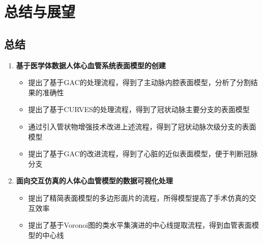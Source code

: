 \section{总结与展望}

\subsection{总结}
\begin{frame}
\begin{enumerate}
\item \textbf{基于医学体数据人体心血管系统表面模型的创建}
\begin{itemize}
\pause \item 提出了基于GAC的处理流程，得到了主动脉内腔表面模型，分析了分割结果的准确性
\pause \item 提出了基于CURVES的处理流程，得到了冠状动脉主要分支的表面模型
\pause \item 通过引入管状物增强技术改进上述流程，得到了冠状动脉次级分支的表面模型
\pause \item 提出了基于GAC的改进流程，得到了心脏的近似表面模型，便于判断冠脉分支
\end{itemize}
\pause \item \textbf{面向交互仿真的人体心血管模型的数据可视化处理}
\begin{itemize}
\pause \item 提出了精简表面模型的多边形面片的流程，所得模型提高了手术仿真的交互效率
\pause \item 提出了基于Voronoi图的类水平集演进的中心线提取流程，得到血管表面模型的中心线
\end{itemize}
\end{enumerate}
\end{frame}

